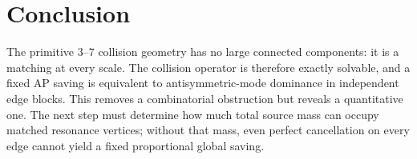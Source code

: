 \section{Conclusion}

The primitive $3$--$7$ collision geometry has no large connected components: it is a
matching at every scale.  The collision operator is therefore exactly solvable, and a
fixed AP saving is equivalent to antisymmetric-mode dominance in independent edge
blocks.  This removes a combinatorial obstruction but reveals a quantitative one.  The
next step must determine how much total source mass can occupy matched resonance
vertices; without that mass, even perfect cancellation on every edge cannot yield a
fixed proportional global saving.

